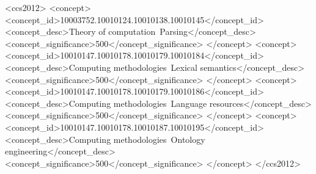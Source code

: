 
\begin{CCSXML}
	<ccs2012>
	<concept>
	<concept_id>10003752.10010124.10010138.10010145</concept_id>
	<concept_desc>Theory of computation~Parsing</concept_desc>
	<concept_significance>500</concept_significance>
	</concept>
	<concept>
	<concept_id>10010147.10010178.10010179.10010184</concept_id>
	<concept_desc>Computing methodologies~Lexical semantics</concept_desc>
	<concept_significance>500</concept_significance>
	</concept>
	<concept>
	<concept_id>10010147.10010178.10010179.10010186</concept_id>
	<concept_desc>Computing methodologies~Language resources</concept_desc>
	<concept_significance>500</concept_significance>
	</concept>
	<concept>
	<concept_id>10010147.10010178.10010187.10010195</concept_id>
	<concept_desc>Computing methodologies~Ontology engineering</concept_desc>
	<concept_significance>500</concept_significance>
	</concept>
	</ccs2012>
\end{CCSXML}



